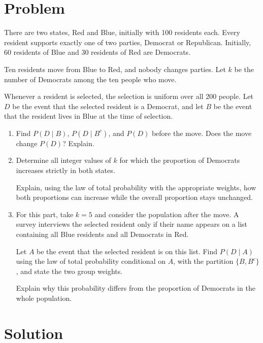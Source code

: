 \documentclass[11pt,a4paper]{article}
\begin{document}
\section*{Problem}

There are two states, Red and Blue, initially with 100
residents each. Every resident supports exactly one of
two parties, Democrat or Republican. Initially, 60
residents of Blue and 30 residents of Red are Democrats.

Ten residents move from Blue to Red, and nobody
changes parties. Let $k$ be the number of Democrats
among the ten people who move.

Whenever a resident is selected, the selection is
uniform over all 200 people. Let $D$ be the event
that the selected resident is a Democrat, and let
$B$ be the event that the resident lives in Blue
at the time of selection.

\begin{enumerate}[label=(\alph*)]

\item Find $P(D\mid B)$, $P(D\mid B^c)$, and
$P(D)$ before the move. Does the move change
$P(D)$? Explain.

\item Determine all integer values of $k$ for
which the proportion of Democrats increases
strictly in both states.

Explain, using the law of total probability with
the appropriate weights, how both proportions
can increase while the overall proportion
stays unchanged.

\item For this part, take $k=5$ and consider
the population after the move. A survey
interviews the selected resident only if their
name appears on a list containing all Blue
residents and all Democrats in Red.

Let $A$ be the event that the selected resident
is on this list. Find $P(D\mid A)$ using the
law of total probability conditional on $A$,
with the partition $\{B,B^c\}$, and state
the two group weights.

Explain why this probability differs from the
proportion of Democrats in the whole population.

\end{enumerate}

\section*{Solution}
\end{document}
